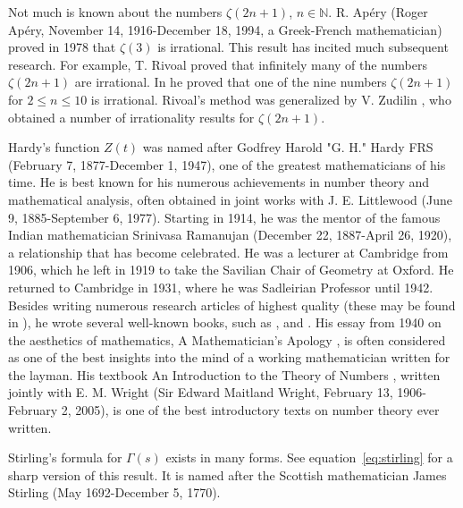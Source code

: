 \documentclass[11pt]{article}
\begin{document}
Not much is known about the numbers $\zeta(2n+1)$, $n \in \mathbb{N}$. R. Apéry \cite{Ape} (Roger Apéry, November 14, 1916-December 18, 1994, a Greek-French mathematician) proved in 1978 that $\zeta(3)$ is irrational. This result has incited much subsequent research. For example, T. Rivoal \cite{Riv1} proved that infinitely many of the numbers $\zeta(2n+1)$ are irrational. In \cite{Riv2} he proved that one of the nine numbers $\zeta(2n+1)$ for $2 \leq n \leq 10$ is irrational. Rivoal's method was generalized by V. Zudilin \cite{Zud}, who obtained a number of irrationality results for $\zeta(2n+1)$.

Hardy's function $Z(t)$ was named after Godfrey Harold "G. H." Hardy FRS (February 7, 1877-December 1, 1947), one of the greatest mathematicians of his time. He is best known for his numerous achievements in number theory and mathematical analysis, often obtained in joint works with J. E. Littlewood (June 9, 1885-September 6, 1977). Starting in 1914, he was the mentor of the famous Indian mathematician Srinivasa Ramanujan (December 22, 1887-April 26, 1920), a relationship that has become celebrated. He was a lecturer at Cambridge from 1906, which he left in 1919 to take the Savilian Chair of Geometry at Oxford. He returned to Cambridge in 1931, where he was Sadleirian Professor until 1942. Besides writing numerous research articles of highest quality (these may be found in \cite{Har7}), he wrote several well-known books, such as \cite{Har4}, \cite{Har5} and \cite{Har6}. His essay from 1940 on the
aesthetics of mathematics, A Mathematician's Apology \cite{Har3}, is often considered as one of the best insights into the mind of a working mathematician written for the layman. His textbook An Introduction to the Theory of Numbers \cite{HaWr}, written jointly with E. M. Wright (Sir Edward Maitland Wright, February 13, 1906-February 2, 2005), is one of the best introductory texts on number theory ever written.

Stirling's formula for $\Gamma(s)$ exists in many forms. See equation~\eqref{eq:stirling} for a sharp version of this result. It is named after the Scottish mathematician James Stirling (May 1692-December 5, 1770).
\end{document}
